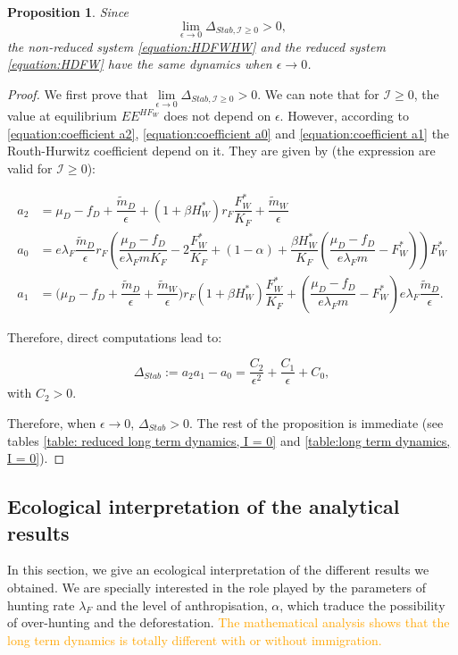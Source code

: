 \documentclass{article}
\newcommand{\lfw}{\lambda_{F}}
\newcommand{\lfw}{\lambda_{F}}
\newcommand{\cI}{\mathcal{I}}
\newcommand{\vdeux}[1]{\textcolor{orange}{#1}}
\newcommand{\vtrois}[1]{\textcolor{OliveGreen}{#1}}
\newtheorem{prop}[theorem]{Proposition}
\theoremstyle{definition}
\theoremstyle{remark}
\begin{document}
\begin{prop}
Since 
$$
\lim\limits_{ \epsilon \rightarrow 0}{\Delta_{Stab, \cI \geq 0}} > 0,
$$
the non-reduced system \eqref{equation:HDFWHW} and the reduced system \eqref{equation:HDFW} have the same dynamics when $\epsilon \rightarrow 0$.
\end{prop}
\begin{proof}
We first prove that $\lim\limits_{ \epsilon \rightarrow 0}{\Delta_{Stab, \cI \geq 0}} > 0$. We can note that for $\cI \geq 0$, the value at equilibrium $EE^{HF_W}$ does not depend on $\epsilon$. However, according to \eqref{equation:coefficient a2}, \eqref{equation:coefficient a0} and \eqref{equation:coefficient a1} the Routh-Hurwitz coefficient depend on it. They are given by (the expression are valid for $\cI \geq 0$):

\begin{align*}
a_2  &= \mu_D - f_D + \dfrac{\tilde m_D}{\epsilon} + (1+\beta H_W^*)r_F \dfrac{F_W^*}{K_F} + \dfrac{\tilde m_W}{\epsilon} \\
a_0 &= e \lfw \dfrac{\tilde m_D}{\epsilon} r_F \left(\dfrac{\mu_D -f_D }{e \lfw m K_F} - 2\dfrac{F_W^*}{K_F} + (1-\alpha) + \dfrac{\beta H_W^*}{K_F} \left(\dfrac{\mu_D -f_D }{e \lfw m} - F_W^*\right) \right) F_W^* \\
a_1 &= \Big( \mu_D  -f_D + \dfrac{\tilde m_D}{\epsilon} + \dfrac{\tilde m_W}{\epsilon} \Big) r_F(1+ \beta H_W^*) \dfrac{F^*_W}{K_F} + \left(\dfrac{\mu_D -f_D}{e\lfw m} - F_W^*\right) e \lfw \dfrac{\tilde m_D}{\epsilon}.
\end{align*}

Therefore, direct computations lead to:

\begin{equation*}
\Delta_{Stab} := a_2 a_1 - a_0 = \dfrac{C_2}{\epsilon^2} + \dfrac{C_1}{\epsilon} + C_0,
\end{equation*}
with $C_2 > 0$.

Therefore, when $\epsilon \rightarrow 0$, $\Delta_{Stab} > 0$. The rest of the proposition is immediate (see tables \ref{table: reduced long term dynamics, I = 0} and \ref{table:long term dynamics, I = 0}).
\end{proof}


\subsection{Ecological interpretation of the analytical results} \label{sec:ecological}
In this section, we give an ecological interpretation of the different results we obtained. We are specially interested in the role played by the parameters of hunting rate $\lfw$ and the level of anthropisation, $\alpha$, which traduce the possibility of over-hunting and the deforestation. 
\vdeux{
The mathematical analysis shows that \vtrois{the long term dynamics} is totally different with or without immigration.}
\end{document}
